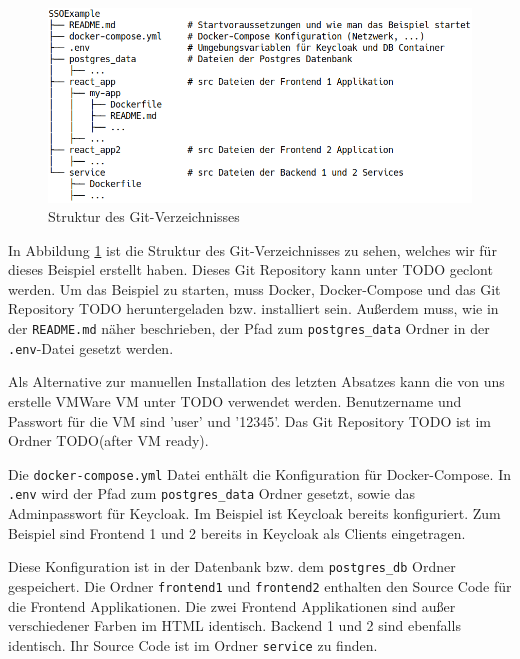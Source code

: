 \begin{figure}[!ht]
	\centering
	\includegraphics[width=1\textwidth]{Images/Ebert/srcDirectoryStructure.PNG}
	\caption{Struktur des Git-Verzeichnisses}
	\label{fig:EB_Struktur des Git-Verzeichnisses}
\end{figure} %

In Abbildung \ref{fig:EB_Struktur des Git-Verzeichnisses} ist die Struktur des Git-Verzeichnisses zu sehen, welches wir für dieses Beispiel erstellt haben. Dieses Git Repository kann unter TODO geclont werden. Um das Beispiel zu starten, muss Docker, Docker-Compose und das Git Repository TODO heruntergeladen bzw. installiert sein. Außerdem muss, wie in der \texttt{README.md} näher beschrieben, der Pfad zum \texttt{postgres\_data} Ordner in der \texttt{.env}-Datei gesetzt werden.

Als Alternative zur manuellen Installation des letzten Absatzes kann die von uns erstelle VMWare VM unter TODO verwendet werden. Benutzername und Passwort für die VM sind 'user' und '12345'. Das Git Repository TODO ist im Ordner TODO(after VM ready).

Die \texttt{docker-compose.yml} Datei enthält die Konfiguration für Docker-Compose. In \texttt{.env} wird der Pfad zum \texttt{postgres\_data} Ordner gesetzt, sowie das Adminpasswort für Keycloak. Im Beispiel ist Keycloak bereits konfiguriert. Zum Beispiel sind Frontend 1 und 2 bereits in Keycloak als Clients eingetragen. 

Diese Konfiguration ist in der Datenbank bzw. dem \texttt{postgres\_db} Ordner gespeichert. Die Ordner \texttt{frontend1} und \texttt{frontend2} enthalten den Source Code für die Frontend Applikationen. Die zwei Frontend Applikationen sind außer verschiedener Farben im HTML identisch. Backend 1 und 2 sind ebenfalls identisch. Ihr Source Code ist im Ordner \texttt{service} zu finden.

